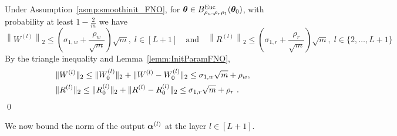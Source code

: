 \begin{prop}
\label{prop:W_l_R_l_bound_FNO}
Under Assumption~\ref{asmp:smoothinit_FNO}, for ${\bm{\theta}}\in B^{\mathrm{Euc}}_{\rho_w,\rho_r\rho_1}({\bm{\theta}}_0)$, with probability at least $1-\frac{2}{m}$ we have
\begin{equation}
    \left\|W^{(l)}\right\|_2 \leq\left(\sigma_{1,w}+\frac{\rho_w}{\sqrt{m}}\right) \sqrt{m},\;l\in[L+1] \quad \text{and}\quad 
    \left\|R^{(l)}\right\|_2 \leq\left(\sigma_{1,r}+\frac{\rho_r}{\sqrt{m}}\right) \sqrt{m},\;l\in\{2,\dots,L+1\}
\end{equation}
\proof By the triangle inequality and Lemma~\ref{lemm:InitParamFNO},
\begin{align*}
    &\| W^{(l)}\|_2 \leq \| {W^{(l)}_0}\|_2 + \| W^{(l)} - {W^{(l)}_0}\|_2 \leq\sigma_{1,w}\sqrt{m} + \rho_w, \\ 
    &\| R^{(l)}\|_2 \leq \| {R^{(l)}_0}\|_2 + \| R^{(l)} - {R^{(l)}_0}\|_2 \leq \sigma_{1,r}\sqrt{m} + \rho_r~.
\end{align*}
\qed
\end{prop}
We now bound the norm of the output $\boldsymbol{\alpha}^{(l)}$ at the layer $l\in[L+1]$.
%
